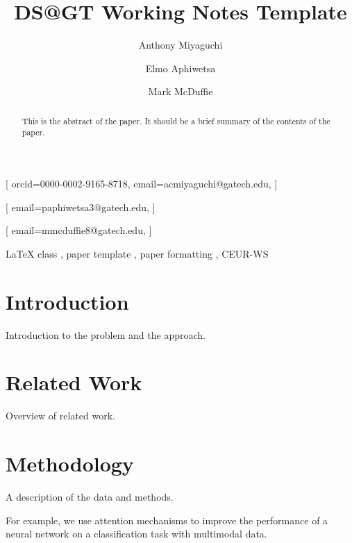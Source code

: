 \documentclass[]{style/ceurart}
\begin{document}


\title{DS@GT Working Notes Template}

\author[1]{Anthony Miyaguchi}[
orcid=0000-0002-9165-8718,
email=acmiyaguchi@gatech.edu,
]
\cormark[1]
\author[1]{Elmo Aphiwetsa}[
email=paphiwetsa3@gatech.edu,
]
\author[1]{Mark McDuffie}[
email=mmcduffie8@gatech.edu,
]

\address[1]{Georgia Institute of Technology, North Ave NW, Atlanta, GA 30332}

\begin{abstract}
    This is the abstract of the paper. 
    It should be a brief summary of the contents of the paper.
\end{abstract}

\begin{keywords}
  LaTeX class \sep
  paper template \sep
  paper formatting \sep
  CEUR-WS
\end{keywords}


\maketitle

\section{Introduction}

Introduction to the problem and the approach.

\section{Related Work}

Overview of related work.

\section{Methodology}

A description of the data and methods.

For example, we use attention mechanisms \cite{vaswani2017attention} to improve the performance of a neural network on a classification task with multimodal data.
\end{document}
